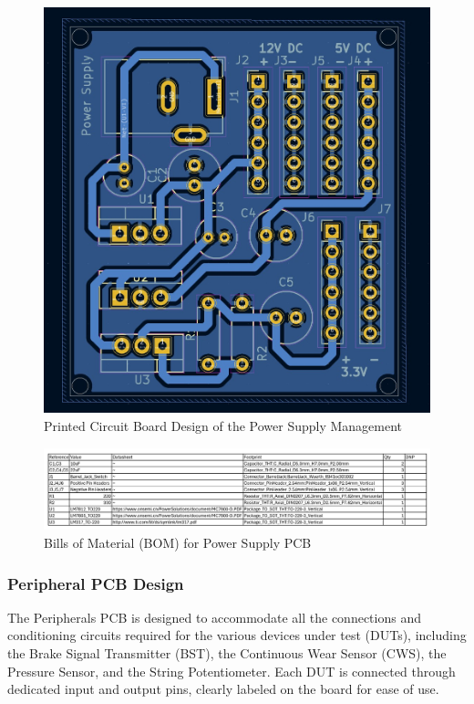\documentclass[12pt]{article}
\begin{document}
\begin{figure}[H]
  \includegraphics[width=\textwidth]{../assets/pcb/image6.jpg}
  \caption{Printed Circuit Board Design of the Power Supply Management}
\end{figure}

\begin{figure}[H]
  \includegraphics[width=\textwidth]{../assets/pcb/image7.jpg}
  \caption{Bills of Material (BOM) for Power Supply PCB}
\end{figure}
\subsubsection*{Peripheral PCB Design}
The Peripherals PCB is designed to accommodate all the connections and
conditioning circuits required for the various devices under test (DUTs),
including the Brake Signal Transmitter (BST), the Continuous Wear Sensor (CWS),
the Pressure Sensor, and the String Potentiometer. Each DUT is connected
through dedicated input and output pins, clearly labeled on the board for ease
of use.
\end{document}
